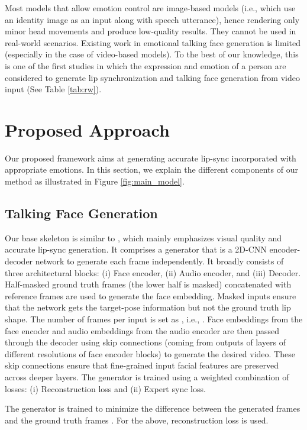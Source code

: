\documentclass[accepted]{uai2023}
\begin{document}
Most models that allow emotion control are image-based models \citep{DBLP:journals/corr/abs-1906-06337, wang2020mead,https://doi.org/10.48550/arxiv.2007.08547, 9496264, sinha2022emotion} (i.e., which use an identity image as an input along with speech utterance), hence rendering only minor head movements and produce low-quality results. They cannot be used in real-world scenarios. Existing work in emotional talking face generation is limited (especially in the case of video-based models). To the best of our knowledge, this is one of the first studies in which the expression and emotion of a person are considered to generate lip synchronization and talking face generation from video input (See Table \ref{tab:rw}).

\section{Proposed Approach}
Our proposed framework aims at generating accurate lip-sync incorporated with appropriate emotions. In this section, we explain the different components of our method as illustrated in Figure \ref{fig:main_model}.

\subsection{Talking Face Generation}
\label{section:bm}
Our base skeleton is similar to \citep{prajwal2020lip}, which mainly emphasizes visual quality and accurate lip-sync generation. It comprises a generator that is a 2D-CNN encoder-decoder network to generate each frame independently. It broadly consists of three architectural blocks: (i) Face encoder, (ii) Audio encoder, and (iii) Decoder. Half-masked ground truth frames (the lower half is masked) concatenated with reference frames are used to generate the face embedding. 
Masked inputs ensure that the network gets the target-pose information but not the ground truth lip shape. The number of frames per input is set as , i.e., . Face embeddings from the face encoder and audio embeddings from the audio encoder are then passed through the decoder using skip connections (coming from outputs of layers of different resolutions of face encoder blocks) to generate the desired video. These skip connections ensure that fine-grained input facial features are preserved across deeper layers.
The generator is trained using a weighted combination of losses: (i) Reconstruction loss and (ii) Expert sync loss.

The generator is trained to minimize the difference between the generated frames  and the ground truth frames . For the above,  reconstruction loss is used.
\end{document}
